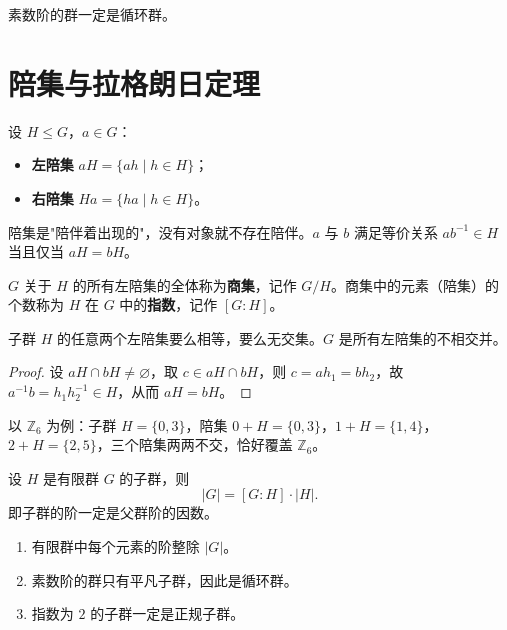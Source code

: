 \begin{proposition}
素数阶的群一定是循环群。
\end{proposition}

\section{陪集与拉格朗日定理}

\begin{definition}[陪集（定义 1.28）]
设 $H \le G$，$a \in G$：
\begin{itemize}
  \item \textbf{左陪集} $aH = \{ah \mid h \in H\}$；
  \item \textbf{右陪集} $Ha = \{ha \mid h \in H\}$。
\end{itemize}
陪集是"陪伴着出现的"，没有对象就不存在陪伴。$a$ 与 $b$ 满足等价关系 $ab^{-1} \in H$ 当且仅当 $aH = bH$。
\end{definition}

\begin{definition}[商集与指数]
$G$ 关于 $H$ 的所有左陪集的全体称为\textbf{商集}，记作 $G/H$。商集中的元素（陪集）的个数称为 $H$ 在 $G$ 中的\textbf{指数}，记作 $[G:H]$。
\end{definition}

\begin{proposition}[命题 1.3.3：陪集的性质]
子群 $H$ 的任意两个左陪集要么相等，要么无交集。$G$ 是所有左陪集的不相交并。
\end{proposition}

\begin{proof}
设 $aH \cap bH \ne \varnothing$，取 $c \in aH \cap bH$，则 $c = ah_1 = bh_2$，故 $a^{-1}b = h_1 h_2^{-1} \in H$，从而 $aH = bH$。
\end{proof}

\begin{note}
以 $\mathbb{Z}_6$ 为例：子群 $H = \{0, 3\}$，陪集 $0+H = \{0,3\}$，$1+H = \{1,4\}$，$2+H = \{2,5\}$，三个陪集两两不交，恰好覆盖 $\mathbb{Z}_6$。
\end{note}

\begin{theorem}[拉格朗日定理]
设 $H$ 是有限群 $G$ 的子群，则
\[
  |G| = [G:H] \cdot |H|.
\]
即子群的阶一定是父群阶的因数。
\end{theorem}

\begin{corollary}
\begin{enumerate}
  \item 有限群中每个元素的阶整除 $|G|$。
  \item 素数阶的群只有平凡子群，因此是循环群。
  \item 指数为 $2$ 的子群一定是正规子群。
\end{enumerate}
\end{corollary}

